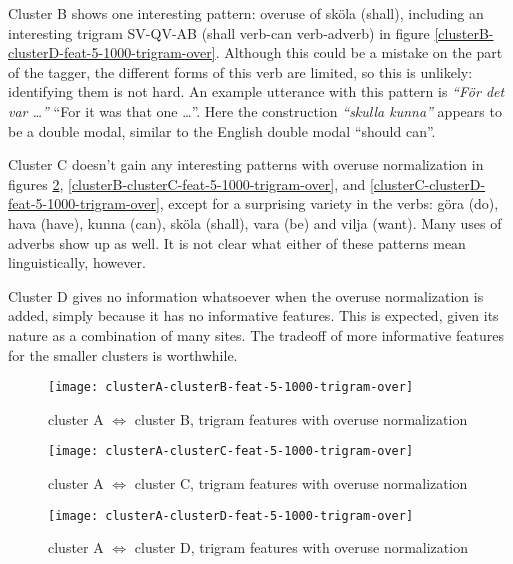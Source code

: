 Cluster B shows one interesting pattern: overuse of sk\"ola (shall),
including an interesting trigram SV-QV-AB (shall verb-can verb-adverb)
in figure \ref{clusterB-clusterD-feat-5-1000-trigram-over}. Although
this could be a mistake on the part of the tagger, the different forms
of this verb are limited, so this is unlikely: identifying them is not
hard. An example utterance with this pattern is \textit{``F\"or det
  var \ldots''} ``For it was that one \ldots''. Here the construction
\textit{``skulla kunna''} appears to be a double modal, similar to the
English double modal ``should can''.

Cluster C doesn't gain any interesting patterns with overuse
normalization in figures
\ref{clusterA-clusterC-feat-5-1000-trigram-over},
\ref{clusterB-clusterC-feat-5-1000-trigram-over}, and
\ref{clusterC-clusterD-feat-5-1000-trigram-over}, except for a
surprising variety in the verbs: g\"ora (do), hava (have), kunna
(can), sk\"ola (shall), vara (be) and vilja (want). Many uses of
adverbs show up as well. It is not clear what either of these patterns
mean linguistically, however.

Cluster D gives no information whatsoever when the overuse
normalization is added, simply because it has no informative
features. This is expected, given its nature as a combination of many
sites. The tradeoff of more informative features for the smaller
clusters is worthwhile.

\begin{figure}
  \texttt{[image: clusterA-clusterB-feat-5-1000-trigram-over]}
  \caption{cluster A $\Leftrightarrow$ cluster B, trigram features
    with overuse normalization}
  \label{clusterA-clusterB-feat-5-1000-trigram-over}
\end{figure}
\begin{figure}
  \texttt{[image: clusterA-clusterC-feat-5-1000-trigram-over]}
  \caption{cluster A $\Leftrightarrow$ cluster C, trigram features
    with overuse normalization}
  \label{clusterA-clusterC-feat-5-1000-trigram-over}
\end{figure}
\begin{figure}
  \texttt{[image: clusterA-clusterD-feat-5-1000-trigram-over]}
  \caption{cluster A $\Leftrightarrow$ cluster D, trigram features
    with overuse normalization}
  \label{clusterA-clusterD-feat-5-1000-trigram-over}
\end{figure}


